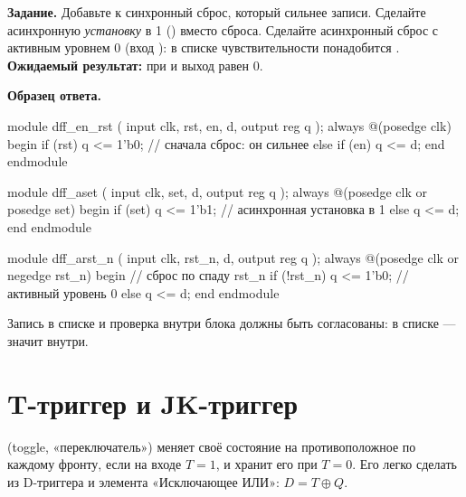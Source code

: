 \begin{diybox}
\textbf{Задание.}  Добавьте к  синхронный сброс, который
сильнее записи.  Сделайте асинхронную \emph{установку} в 1
() вместо сброса.  Сделайте асинхронный сброс с активным
уровнем 0 (вход ): в списке чувствительности понадобится
.\\
\textbf{Ожидаемый результат:} при  и  выход равен 0.
\end{diybox}

\textbf{Образец ответа.}
\begin{vcode}
module dff_en_rst (
    input      clk, rst, en, d,
    output reg q
);
    always @(posedge clk) begin
        if (rst)     q <= 1'b0;    // сначала сброс: он сильнее
        else if (en) q <= d;
    end
endmodule

module dff_aset (
    input      clk, set, d,
    output reg q
);
    always @(posedge clk or posedge set) begin
        if (set) q <= 1'b1;        // асинхронная установка в 1
        else     q <= d;
    end
endmodule

module dff_arst_n (
    input      clk, rst_n, d,
    output reg q
);
    always @(posedge clk or negedge rst_n) begin   // сброс по спаду rst_n
        if (!rst_n) q <= 1'b0;                      // активный уровень 0
        else        q <= d;
    end
endmodule
\end{vcode}
Запись в списке и проверка внутри блока должны быть согласованы:  в списке --- значит  внутри.

\section{T-триггер и JK-триггер}

 (toggle, «переключатель») меняет своё состояние на
противоположное по каждому фронту, если на входе $T=1$, и хранит его при
$T=0$. Его легко сделать из D-триггера и элемента «Исключающее ИЛИ»:
$D = T \oplus Q$.

